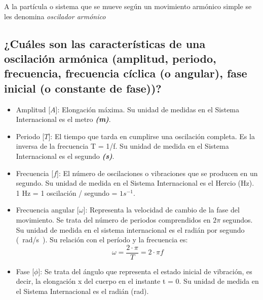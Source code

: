 \documentclass[twocolumn, 12pt]{article}
\newcommand{\bolditalic}[1]{\textbf{\textit{#1}}}
\begin{document}
A la partícula o sistema que se mueve según un movimiento
armónico simple se les denomina \textit{oscilador armónico}

\nocite{movimiento-armonico-simple}

\subsection{¿Cuáles son las características de una oscilación armónica (amplitud, periodo, frecuencia,
    frecuencia cíclica (o angular), fase inicial (o constante de fase))?}

\begin{itemize}[label=$\triangleright$]
    \item Amplitud [{\large $A$}]: Elongación máxima. Su unidad de
          medidas en el Sistema Internacional es el metro
          \bolditalic{(m)}.

    \item Periodo [{\large $T$}]: El tiempo que tarda en cumplirse
          una oscilación completa. Es la inversa de la frecuencia T =
          1/f. Su unidad de medida en el Sistema Internacional es el
          segundo \bolditalic{(s)}.

    \item Frecuencia [{\large $f$}]: El número de oscilaciones o
          vibraciones que se producen en un segundo. Su unidad de
          medida en el Sistema Internacional es el Hercio (Hz). 1 Hz
          = 1 oscilación / segundo = $1 s^{-1}$.

    \item Frecuencia angular [{\large $\omega$}]: Representa la
          velocidad de cambio de la fase del movimiento. Se trata del
          número de periodos comprendidos en $2\pi$ segundos. Su
          unidad de medida en el sistema internacional es el radián
          por segundo (\@~rad/s\@~). Su relación con el período y la
          frecuencia es: {\large
          \begin{equation}
              \omega = \frac{2 \cdot \pi}{T} = 2 \cdot \pi f
          \end{equation}
          }

    \item Fase [{\large $\phi$}]: Se trata del ángulo que representa
          el estado inicial de vibración, es decir, la elongación x
          del cuerpo en el instante t = 0. Su unidad de medida en el
          Sistema Internacional es el radián (rad).
\end{itemize}
\end{document}
